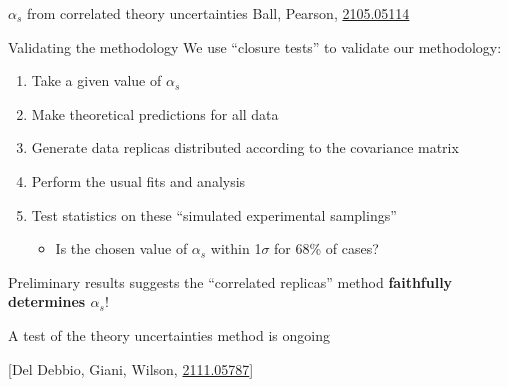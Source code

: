 \documentclass[8pt,t]{beamer}
\begin{document}
\begin{frame}{$\alpha_s$ from correlated theory uncertainties}
  \vspace*{1em}
  {\color{gray} \footnotesize Ball, Pearson, \hyperlink{https://arxiv.org/abs/2105.05114}{2105.05114}}

\end{frame}


\begin{frame}{Validating the methodology}
  We use ``closure tests'' to validate our methodology:
  \begin{enumerate}
    \item Take a given value of $\alpha_s$
    \item Make theoretical predictions for all data
    \item Generate data replicas distributed according to the covariance matrix
    \item Perform the usual fits and analysis
    \item Test statistics on these ``simulated experimental samplings''
    \begin{itemize}
      \item Is the chosen value of $\alpha_s$ within 1$\sigma$ for 68\% of cases?
    \end{itemize}
  \end{enumerate}

  \vspace{1em}
  Preliminary results suggests the “correlated replicas” method \textbf{faithfully determines $\alpha_s$}!

  \vspace{1em}
  A test of the theory uncertainties method is ongoing


  \vspace*{1em}
  {\color{gray} \footnotesize [Del Debbio, Giani, Wilson, \hyperlink{https://arxiv.org/abs/2111.05787}{2111.05787}]}

\end{frame}
\end{document}

